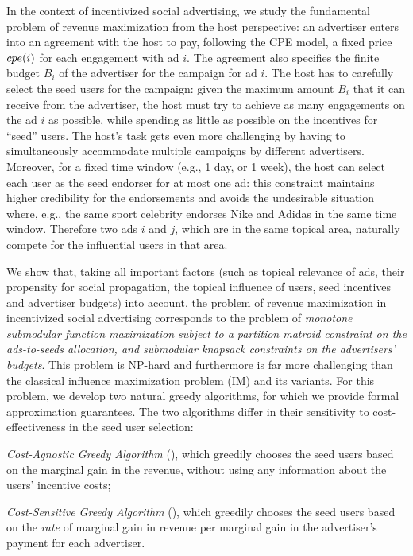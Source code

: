 
\enlargethispage{\baselineskip}
 In the context of incentivized social advertising, we study the fundamental problem of revenue maximization from the host perspective: an advertiser enters into an agreement with the host to pay, following the CPE model, a fixed price $cpe({i})$ for each engagement with ad $i$. The agreement also specifies the finite budget $B_i$ of the advertiser for the campaign for ad $i$. The host has to carefully select the seed users for the campaign: given the maximum amount $B_i$ that it can receive from the advertiser, the host must try to achieve as many engagements on the ad $i$ as possible, while spending as little as possible on the incentives for ``seed'' users. The host's task gets even more challenging by having to simultaneously accommodate multiple  campaigns by different advertisers. Moreover, for a fixed time window (e.g., 1 day, or 1 week), the host can select each user as the seed endorser for at most one ad: this constraint maintains higher credibility for the endorsements and avoids the undesirable situation where, e.g., the same sport celebrity endorses Nike and Adidas in the same time window. Therefore two ads $i$ and $j$, which are in the same topical area, naturally compete for the influential users in that area.

We show that, taking all important factors (such as topical relevance of ads, their propensity for social propagation, the topical influence of users, seed  incentives and advertiser budgets) into account, the problem of revenue maximization in incentivized social advertising corresponds to the problem of \emph{monotone submodular function maximization subject to a partition matroid constraint on the ads-to-seeds allocation, and submodular knapsack constraints on the advertisers' budgets}. This problem is NP-hard and furthermore is far more challenging than the classical influence maximization problem (IM) \cite{kempe03}  and its variants.
For this problem, we develop two natural greedy algorithms, for which we provide formal approximation guarantees. The two algorithms differ in their sensitivity to cost-effectiveness in the seed user selection:
\squishlist
  \item \emph{Cost-Agnostic Greedy Algorithm} (\CARM), which greedily chooses the seed users based on the marginal gain in the revenue, without using any information about the users' incentive costs;
  \item \emph{Cost-Sensitive Greedy Algorithm} (\CSRM), which greedily chooses the seed users based on the \emph{rate} of marginal gain in revenue per marginal gain in the advertiser's payment for each advertiser.
\squishend

